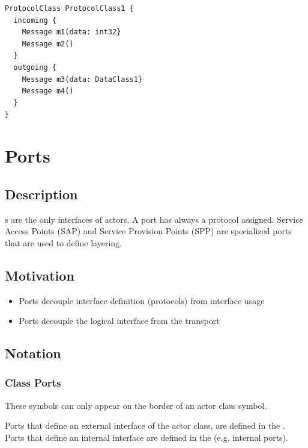 \begin{lstlisting}
ProtocolClass ProtocolClass1 {
  incoming {
    Message m1(data: int32}
    Message m2()
  }
  outgoing {
    Message m3(data: DataClass1}
    Message m4()
  }
}
\end{lstlisting}

\section{Ports}

\subsection{Description}

s are the only interfaces of actors. A port has always a protocol assigned. 
Service Access Points (SAP) and Service Provision Points (SPP) are specialized ports that are used to 
define layering.

\subsection{Motivation}

\begin{itemize}
\item Ports decouple interface definition (protocols) from interface usage
\item Ports decouple the logical interface from the transport 
\end{itemize}

\subsection{Notation}

\subsubsection*{Class Ports}

These symbols can only appear on the border of an actor class symbol.

Ports that define an external interface of the actor class, are defined in the . Ports 
that define an internal interface are defined in the  (e.g. internal ports).

